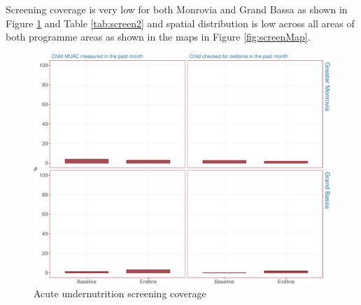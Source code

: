 \documentclass[12pt,a4paper]{article}
\begin{document}
Screening coverage is very low for both Monrovia and Grand Bassa as shown in Figure \ref{fig:screen1} and Table \ref{tab:screen2} and spatial distribution is low across all areas of both programme areas as shown in the maps in Figure \ref{fig:screenMap}.

\begin{figure}[H]

{\centering \includegraphics{liberiaCoverageFinalReport_files/figure-latex/screen1-1} 

}

\caption{Acute undernutrition screening coverage}\label{fig:screen1}
\end{figure}
\end{document}
